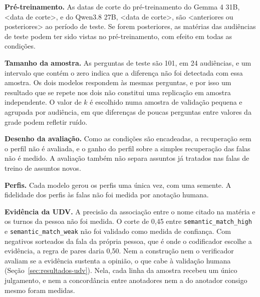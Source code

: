 \textbf{Pré-treinamento.} As datas de corte do pré-treinamento do Gemma 4 31B, <data de corte>, e do
Qwen3.8 27B, <data de corte>, são <anteriores ou posteriores> ao período de teste. Se forem
posteriores, as matérias das audiências de teste podem ter sido vistas no pré-treinamento, com
efeito em todas as condições.

\textbf{Tamanho da amostra.} As perguntas de teste são 101, em 24 audiências, e um intervalo que
contém o zero indica que a diferença não foi detectada com essa amostra. Os dois modelos respondem
às mesmas perguntas, e por isso um resultado que se repete nos dois não constitui uma replicação em
amostra independente. O valor de $k$ é escolhido numa amostra de validação pequena e agrupada por audiência, em
que diferenças de poucas perguntas entre valores da grade podem refletir ruído.

\textbf{Desenho da avaliação.} Como as condições são encadeadas, a recuperação sem o perfil não é
avaliada, e o ganho do perfil sobre a simples recuperação das falas não é medido. A avaliação
também não separa assuntos já tratados nas falas de treino de assuntos novos.

\textbf{Perfis.} Cada modelo gerou os perfis uma única vez, com uma semente. A fidelidade dos perfis às falas não foi medida por anotação humana.

\textbf{Evidência da UDV.} A precisão da associação entre o nome citado na matéria e os turnos da
pessoa não foi medida. O corte de 0,45 entre \texttt{semantic\_match\_high} e
\texttt{semantic\_match\_weak} não foi validado como medida de confiança. Com negativos sorteados da
fala da própria pessoa, que é onde o codificador escolhe a evidência, a regra de pares daria 0,50. Nem
a construção nem o
verificador avaliam se a evidência sustenta a opinião, o que cabe à validação humana
(Seção~\ref{sec:resultados-udv}). Nela, cada linha da amostra recebeu um único julgamento, e nem a
concordância entre anotadores nem a do anotador consigo mesmo foram medidas.
